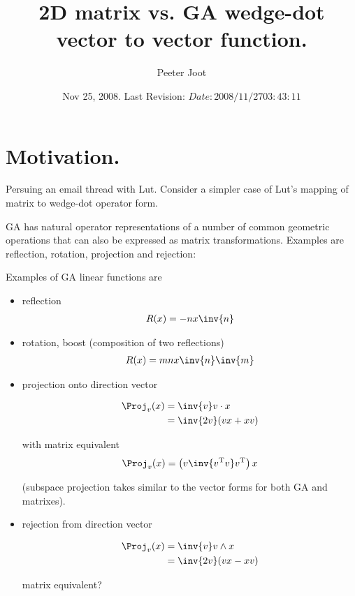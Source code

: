 \documentclass{article}
\title{ 2D matrix vs. GA wedge-dot vector to vector function. }
\author{Peeter Joot}
\date{ Nov 25, 2008.  Last Revision: $Date: 2008/11/27 03:43:11 $ }
\newcommand{\T}[0]{{\text{T}}}
\begin{document}
\maketitle{}

\section{ Motivation. }

Persuing an email thread with Lut.  
Consider a simpler case of Lut's mapping of matrix to wedge-dot operator form.

GA has natural operator representations of a number of common geometric
operations that can also be expressed as matrix transformations.  Examples
are reflection, rotation, projection and rejection:

Examples of GA linear functions are

\begin{itemize}
\item reflection
\begin{align*}
R(x) = -n x \inv{n}
\end{align*}

\item rotation, boost (composition of two reflections)
\begin{align*}
R(x)
&= m n x \inv{n} \inv{m} \\
\end{align*}

\item projection onto direction vector

\begin{align*}
\Proj_v(x) 
&= \inv{v} v \cdot x \\
&= \inv{2v} (v x + x v) \\
\end{align*}

with matrix equivalent
\begin{align*}
\Proj_v(x) = \left(v \inv{v^\T v} v^\T \right) x
\end{align*}

(subspace projection takes similar to the vector forms for both GA and matrixes).

\item rejection from direction vector

\begin{align*}
\Proj_v(x) 
&= \inv{v} v \wedge x \\
&= \inv{2v} (v x - x v) \\
\end{align*}

matrix equivalent?

\end{itemize}
\end{document}
